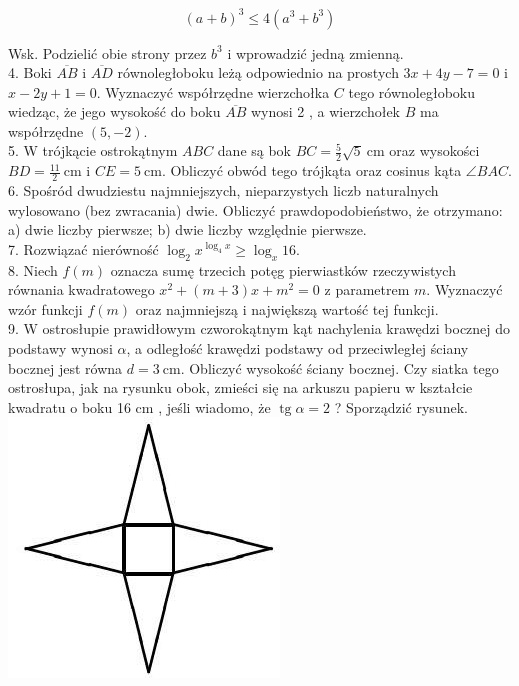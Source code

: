 \documentclass[10pt]{article}
\begin{document}
$$
(a+b)^{3} \leqslant 4\left(a^{3}+b^{3}\right)
$$

Wsk. Podzielić obie strony przez $b^{3}$ i wprowadzić jedną zmienną.\\
4. Boki $\overline{A B}$ i $\overline{A D}$ równoległoboku leżą odpowiednio na prostych $3 x+4 y-7=0$ i $x-2 y+1=0$. Wyznaczyć współrzędne wierzchołka $C$ tego równoległoboku wiedząc, że jego wysokość do boku $\overline{A B}$ wynosi 2 , a wierzchołek $B$ ma współrzędne $(5,-2)$.\\
5. W trójkącie ostrokątnym $A B C$ dane są bok $B C=\frac{5}{2} \sqrt{5} \mathrm{~cm}$ oraz wysokości $B D=\frac{11}{2} \mathrm{~cm}$ i $C E=5 \mathrm{~cm}$. Obliczyć obwód tego trójkąta oraz cosinus kąta $\angle B A C$.\\
6. Spośród dwudziestu najmniejszych, nieparzystych liczb naturalnych wylosowano (bez zwracania) dwie. Obliczyć prawdopodobieństwo, że otrzymano: a) dwie liczby pierwsze; b) dwie liczby względnie pierwsze.\\
7. Rozwiązać nierówność $\log _{2} x^{\log _{4} x} \geqslant \log _{x} 16$.\\
8. Niech $f(m)$ oznacza sumę trzecich potęg pierwiastków rzeczywistych równania kwadratowego $x^{2}+(m+3) x+m^{2}=0$ z parametrem $m$. Wyznaczyć wzór funkcji $f(m)$ oraz najmniejszą i największą wartość tej funkcji.\\
9. W ostrosłupie prawidłowym czworokątnym kąt nachylenia krawędzi bocznej do podstawy wynosi $\alpha$, a odległość krawędzi podstawy od przeciwległej ściany bocznej jest równa $d=3 \mathrm{~cm}$. Obliczyć wysokość ściany bocznej. Czy siatka tego ostrosłupa, jak na rysunku obok, zmieści się na arkuszu papieru w kształcie kwadratu o boku 16 cm , jeśli wiadomo, że $\operatorname{tg} \alpha=2$ ? Sporządzić rysunek.\\
\includegraphics[max width=\textwidth, center]{2024_11_16_8518088a6e381b1443b2g-3}
\end{document}
